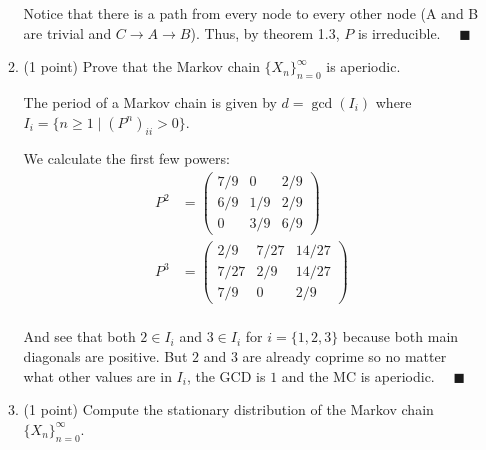 \documentclass[11pt,letterpaper, leqno]{article}
\numberwithin{equation}{section}
\numberwithin{theorem}{section}
\numberwithin{lemma}{section}
\numberwithin{corollary}{section}
\numberwithin{definition}{section}
\numberwithin{proposition}{section}
\numberwithin{remark}{section}
\numberwithin{example}{section}
\renewcommand{\qed}{\quad \blacksquare}
\begin{document}
\begin{enumerate}
\begin{enumerate}
\begin{center}
                \end{center}
                Notice that there is a path from every node to every other node (A and B are trivial and $C \to A \to B$). Thus, by theorem 1.3, $P$ is irreducible. $\qed$
            \color{black}

        \item (1 point) Prove that the Markov chain $\{X_n\}_{n=0}^\infty$ is aperiodic.
       
            \color{blue}
                The period of a Markov chain is given by $d = \gcd(I_i)$ where $I_i = \{n \geq 1\; | \; (P^n)_{ii} > 0\}$. 

                We calculate the first few powers:
                \begin{align*}
                    P^2 &= \begin{pmatrix}
                        7/9 & 0 & 2/9\\
                        6/9 & 1/9 & 2/9\\
                        0 & 3/9 & 6/9
                    \end{pmatrix}\\
                    P^3 &= \begin{pmatrix}
                        2/9 & 7/27 & 14/27\\
                        7/27 & 2/9 & 14/27\\
                        7/9 & 0 & 2/9
                    \end{pmatrix}\\
                \end{align*}

                And see that both $2\in I_i$ and $3 \in I_i$ for $i= \{1, 2, 3\}$ because both main diagonals are positive. But $2$ and $3$ are already coprime so no matter what other values are in $I_i$, the GCD is $1$ and the MC is aperiodic. $\qed$
            \color{black}
                
        \item (1 point) Compute the stationary distribution of the Markov chain $\{X_n\}_{n=0}^\infty$.
        

\end{enumerate}
\end{enumerate}
\end{document}
